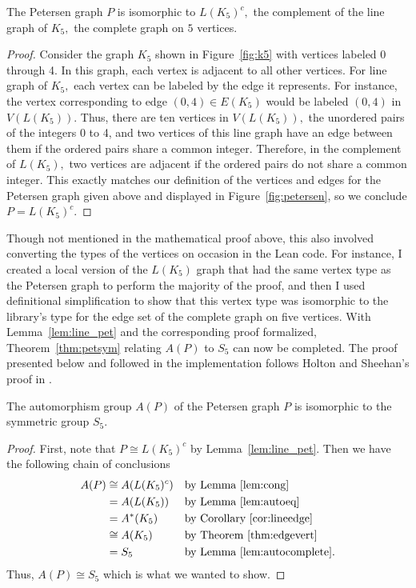 \documentclass{article}
\begin{document}
\begin{lemma}\label{lem:line_pet}
    The Petersen graph $P$ is isomorphic to $L(K_5)^c,$ the complement of the line graph of $K_5,$ the complete graph on $5$ vertices.
\end{lemma}
\begin{proof}
    Consider the graph $K_5$ shown in Figure~\ref{fig:k5} with vertices labeled 0 through 4. In this graph, each vertex is adjacent to all other vertices. For line graph of $K_5,$ each vertex can be labeled by the edge it represents. For instance, the vertex corresponding to edge $(0,4) \in E(K_5)$ would be labeled $(0,4)$ in $V(L(K_5)).$ Thus, there are ten vertices in $V(L(K_5)),$ the unordered pairs of the integers 0 to 4, and two vertices of this line graph have an edge between them if the ordered pairs share a common integer. Therefore, in the complement of $L(K_5),$ two vertices are adjacent if the ordered pairs do not share a common integer. This exactly matches our definition of the vertices and edges for the Petersen graph given above and displayed in Figure~\ref{fig:petersen}, so we conclude $P = L(K_5)^c.$
\end{proof}
Though not mentioned in the mathematical proof above, this also involved converting the types of the vertices on occasion in the Lean code. For instance, I created a local version of the $L(K_5)$ graph that had the same vertex type as the Petersen graph to perform the majority of the proof, and then I used definitional simplification to show that this vertex type was isomorphic to the library's type for the edge set of the complete graph on five vertices. With Lemma~\ref{lem:line_pet} and the corresponding proof formalized, Theorem~\ref{thm:petsym} relating $A(P)$ to $S_5$ can now be completed. The proof presented below and followed in the implementation follows Holton and Sheehan's proof in \cite{holton}. 

\begin{theorem}\label{thm:petsym}
The automorphism group $A(P)$ of the Petersen graph $P$ is isomorphic to the symmetric group $S_5$.
\end{theorem}
\begin{proof}
    First, note that $P \cong L(K_5)^c$ by Lemma~\ref{lem:line_pet}. Then we have the following chain of conclusions
    \begin{align*}
        A(P) &\cong A(L(K_5)^c) &&\text{by Lemma~\ref{lem:cong}}\\
        &= A(L(K_5)) &&\text{by Lemma~\ref{lem:autoeq}}\\
        &= A^*(K_5) &&\text{by Corollary~\ref{cor:lineedge}}\\
        &\cong A(K_5) &&\text{by Theorem~\ref{thm:edgevert}}\\
        &= S_5 &&\text{by Lemma~\ref{lem:autocomplete}}.
    \end{align*}
    Thus, $A(P) \cong S_5$ which is what we wanted to show.
\end{proof}
\end{document}
